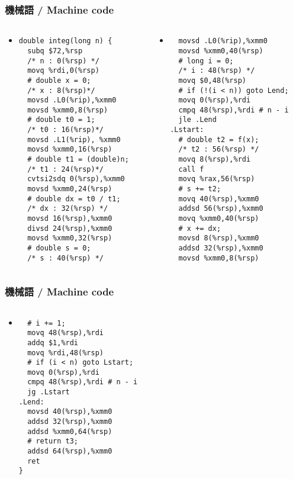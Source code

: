 \documentclass[12pt,dvipdfmx]{beamer}
\begin{document}
\begin{frame}[fragile]
  \frametitle{機械語 / Machine code}
  \begin{columns}
    \begin{column}{0.49\textwidth}
  \begin{itemize}
  \item []
\begin{lstlisting}
double integ(long n) {
  subq $72,%rsp    
  /* n : 0(%rsp) */
  movq %rdi,0(%rsp)  
  # double x = 0;
  /* x : 8(%rsp)*/
  movsd .L0(%rip),%xmm0
  movsd %xmm0,8(%rsp)
  # double t0 = 1;
  /* t0 : 16(%rsp)*/
  movsd .L1(%rip), %xmm0
  movsd %xmm0,16(%rsp)
  # double t1 = (double)n;
  /* t1 : 24(%rsp)*/
  cvtsi2sdq 0(%rsp),%xmm0
  movsd %xmm0,24(%rsp)
  # double dx = t0 / t1;
  /* dx : 32(%rsp) */
  movsd 16(%rsp),%xmm0
  divsd 24(%rsp),%xmm0
  movsd %xmm0,32(%rsp)
  # double s = 0;
  /* s : 40(%rsp) */
\end{lstlisting}%
  \end{itemize}
    \end{column}
    \begin{column}{0.49\textwidth}
  \begin{itemize}
  \item []
\begin{lstlisting}
  movsd .L0(%rip),%xmm0
  movsd %xmm0,40(%rsp)
  # long i = 0;
  /* i : 48(%rsp) */
  movq $0,48(%rsp)
  # if (!(i < n)) goto Lend;
  movq 0(%rsp),%rdi
  cmpq 48(%rsp),%rdi # n - i
  jle .Lend
.Lstart:
  # double t2 = f(x);
  /* t2 : 56(%rsp) */
  movq 8(%rsp),%rdi
  call f
  movq %rax,56(%rsp)
  # s += t2;
  movq 40(%rsp),%xmm0
  addsd 56(%rsp),%xmm0
  movq %xmm0,40(%rsp)
  # x += dx;
  movsd 8(%rsp),%xmm0
  addsd 32(%rsp),%xmm0
  movsd %xmm0,8(%rsp)
\end{lstlisting}%
\end{itemize}
\end{column}
\end{columns}
\end{frame}


\begin{frame}[fragile]
  \frametitle{機械語 / Machine code}
  \begin{columns}
    \begin{column}{0.49\textwidth}
  \begin{itemize}
  \item []
\begin{lstlisting}
  # i += 1;
  movq 48(%rsp),%rdi
  addq $1,%rdi
  movq %rdi,48(%rsp)
  # if (i < n) goto Lstart;
  movq 0(%rsp),%rdi
  cmpq 48(%rsp),%rdi # n - i
  jg .Lstart
.Lend:
  movsd 40(%rsp),%xmm0
  addsd 32(%rsp),%xmm0
  addsd %xmm0,64(%rsp)
  # return t3;
  addsd 64(%rsp),%xmm0
  ret
}
\end{lstlisting}%
  \end{itemize}
    \begin{column}{0.49\textwidth}
\phantom{aaa}
\end{column}
    \end{column}
\end{columns}
\end{frame}
\end{document}
